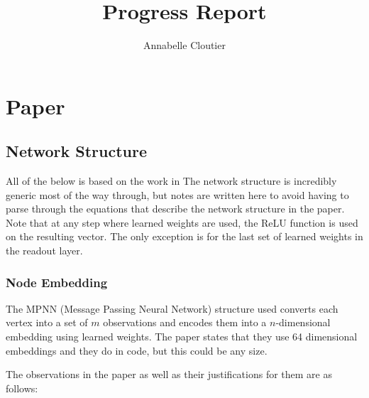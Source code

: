 \documentclass{article}
\title{Progress Report}
\author{Annabelle Cloutier}
\begin{document}
\maketitle

\section{Paper}

\subsection{Network Structure}

All of the below is based on the work in \cite{eco-dqn}
The network structure is incredibly generic most of the way through, but notes are written here to avoid having to parse through the equations that describe the network structure in the paper. Note that at any step where learned weights are used, the ReLU function is used on the resulting vector. The only exception is for the last set of learned weights in the readout layer.

\subsubsection{Node Embedding}

The MPNN (Message Passing Neural Network) structure used converts each vertex into a set of $m$ observations and encodes them into a $n$-dimensional embedding using learned weights. The paper states that they use 64 dimensional embeddings and they do in code, but this could be any size. 

The observations in the paper as well as their justifications for them are as follows: 
\end{document}
